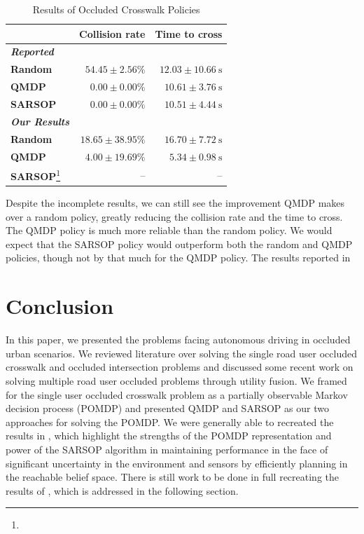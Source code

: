 \documentclass[conference]{IEEEtran}
\begin{document}
\begin{table}[tbhp]
    \caption{Results of Occluded Crosswalk Policies}
    \begin{center}
        \begin{tabular}{lrr}
            \hline \hline
            & \textbf{Collision rate} \hspace{3pt} & \textbf{Time to cross} \hspace{1pt} \\
            \hline
            \textit{\textbf{Reported}} & & \\
            \textbf{Random} & $54.45 \pm 2.56\%$ & $12.03 \pm 10.66 ~\si{\second}$ \\
            \textbf{QMDP}   & $0.00 \pm 0.00\%$  & $10.61 \pm 3.76 ~\si{\second}$ \\
            \textbf{SARSOP} & $0.00 \pm 0.00\%$ & $10.51 \pm 4.44 ~\si{\second}$ \\
            \hline
            \textit{\textbf{Our Results}} & & \\
            \textbf{Random} & $18.65 \pm 38.95\%$ & $16.70 \pm 7.72 ~\si{\second}$ \\
            \textbf{QMDP}   & $4.00 \pm 19.69\%$  & $5.34 \pm 0.98 ~\si{\second}$ \\
            \textbf{SARSOP}\footnote{} & -- & -- \\
            \hline \hline
        \end{tabular}
        \label{tab:results}
    \end{center}
\end{table}

Despite the incomplete results, we can still see the improvement QMDP makes over a random policy, greatly reducing the collision rate and the time to cross. The QMDP policy is much more reliable than the random policy. We would expect that the SARSOP policy would outperform both the random and QMDP policies, though not by that much for the QMDP policy. The results reported in \cite{Bouton2018ScalableDriving}


\section{Conclusion}
\label{sec:conclusion}

In this paper, we presented the problems facing autonomous driving in occluded urban scenarios. We reviewed literature over solving the single road user occluded crosswalk and occluded intersection problems and discussed some recent work on solving multiple road user occluded problems through utility fusion. We framed for the single user occluded crosswalk problem as a partially observable Markov decision process (POMDP) and presented QMDP and SARSOP as our two approaches for solving the POMDP. We were generally able to recreated the results in \cite{Bouton2018ScalableDriving}, which highlight the strengths of the POMDP representation and power of the SARSOP algorithm in maintaining performance in the face of significant uncertainty in the environment and sensors by efficiently planning in the reachable belief space. There is still work to be done in full recreating the results of \cite{Bouton2018ScalableDriving}, which is addressed in the following section.
\end{document}
